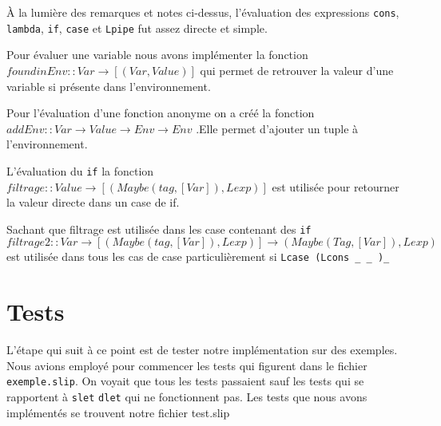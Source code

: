 \documentclass[10pt, titlepage]{article}
\begin{document}
À la lumière des remarques et notes ci-dessus, l'évaluation des expressions
\texttt{cons}, \texttt{lambda}, \texttt{if}, \texttt{case} et \texttt{Lpipe}
fut assez directe et simple. 

Pour évaluer une variable nous avons implémenter la fonction  $foundinEnv::Var \rightarrow [(Var,Value)]$ qui permet de retrouver la valeur d'une variable si présente dans l'environnement.

Pour l'évaluation d'une fonction anonyme on a créé la fonction  $addEnv:: Var \rightarrow Value \rightarrow Env \rightarrow Env$ .Elle permet d'ajouter un tuple à l'environnement.

L'évaluation du \texttt{if}  la fonction $filtrage::Value \rightarrow[(Maybe(tag,[Var]),Lexp)]$ est utilisée  pour retourner la valeur directe dans un case de if.

Sachant que filtrage est utilisée dans les case contenant des \texttt{if}   $filtrage2::Var \rightarrow [(Maybe(tag,[Var]),Lexp)] \rightarrow (Maybe(Tag,[Var]),Lexp)$  est utilisée dans tous les cas de case particulièrement si \texttt{Lcase (Lcons _ _ )_}   


\section{Tests}

L'étape qui suit à ce point est de tester notre implémentation sur des
exemples. Nous avions employé pour commencer les tests qui figurent dans le
fichier \texttt{exemple.slip}. On voyait que tous les tests passaient sauf les tests qui se rapportent à \texttt{slet} \texttt{dlet} qui ne fonctionnent pas. Les tests que nous avons implémentés se trouvent notre fichier test.slip
\end{document}
